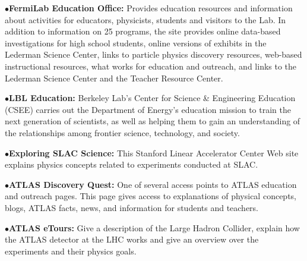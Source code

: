 \medskip

\item{$\bullet$}{\bf FermiLab Education Office:} 
Provides  education resources and information about activities for educators, physicists, students and visitors to the Lab. In addition to information on 25 programs, the site  provides online data-based investigations for high school students, online versions of exhibits in the Lederman Science Center, links to particle physics discovery resources, web-based instructional resources, what works for education and outreach, and links to the Lederman Science Center and the Teacher Resource Center.
	\item{}

\medskip

\item{$\bullet$}{\bf LBL Education:} 
Berkeley Lab's Center for Science \& Engineering Education (CSEE) carries out the Department of Energy’s education mission to train the next generation of scientists, as well as helping them to gain an understanding of the relationships among frontier science, technology, and society.
	\item{}

\medskip

\item{$\bullet$}{\bf Exploring SLAC Science:}
This Stanford Linear Accelerator Center Web site explains physics concepts related to experiments conducted at SLAC.
	\item{}



\medskip
\medskip



\medskip

\item{$\bullet$}{\bf ATLAS Discovery Quest:} 
One of several access points to ATLAS education and outreach pages. This page gives access to explanations of physical concepts, blogs, ATLAS facts, news, and information for students and teachers.
   \item{}     


\vfil\eject
\item{$\bullet$}{\bf ATLAS eTours:} 
Give a description of the Large Hadron Collider, explain how the ATLAS detector at the LHC works and give an overview over the experiments and their physics goals. 
	\item{}

